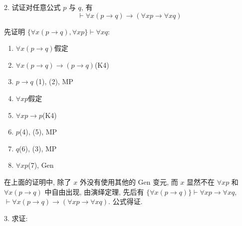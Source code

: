 \documentclass[boxes]{homework}
\begin{document}
\begin{problem}
2. 试证对任意公式 $p$ 与 $q$, 有
$$
    \vdash \forall x(p\to q)\to (\forall xp\to \forall xq)
$$
\end{problem}
\begin{solution}
    先证明 $\{\forall x(p\to q), \forall x p\}\vdash \forall xq$:
    \begin{enumerate}[label = (\arabic*), itemsep = 0em, topsep = .5em, partopsep = .5em]
        \item $\forall x(p\to q)$\hfill 假定
        \item $\forall x(p\to q)\to (p\to q)$\hfill (K4)
        \item $p\to q$ \hfill (1), (2), MP
        \item $\forall x p$\hfill 假定
        \item $\forall x p\to p$\hfill (K4)
        \item $p$\hfill (4), (5), MP
        \item $q$\hfill (6), (3), MP
        \item $\forall xp$\hfill (7), Gen
    \end{enumerate}
    在上面的证明中, 除了 $x$ 外没有使用其他的 Gen 变元, 而 $x$ 显然不在 $\forall x p$ 和 $\forall x(p\to q)$ 中自由出现, 由演绎定理, 先后有 $\{\forall x(p\to q)\}\vdash \forall xp\to \forall xq$, $\vdash \forall x(p\to q)\to (\forall xp\to \forall xq)$. 公式得证.
\end{solution}
\begin{problem}
3. 求证:
\end{problem}
\end{document}
